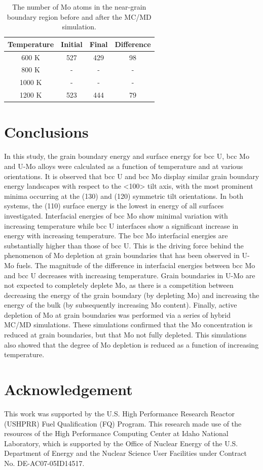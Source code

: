 \documentclass[review]{elsarticle}
\begin{document}
\begin{table}[h]
\caption{The number of Mo atoms in the near-grain boundary region before and after the MC/MD simulation. } \label{tab:mcmdtemp}
\begin{center}
\begin{tabular}{|c|c|c|c|}
	\hline
Temperature & Initial & Final & Difference \\
\hline
600 K & 527 & 429 & 98 \\
800 K & - & - & -\\ 
1000 K & - & - & - \\
1200 K & 523 & 444 & 79 \\
 	 \hline
\end{tabular}
\end{center}
\label{default}
\end{table}

\FloatBarrier

\section{Conclusions}

In this study, the grain boundary energy and surface energy for bcc U, bcc Mo and U-Mo alloys were calculated as a function of temperature and at various orientations. It is observed that bcc U and bcc Mo display similar grain boundary energy landscapes with respect to the <100> tilt axis, with the most prominent minima occurring at the (130) and (120) symmetric tilt orientations. In both systems, the (110) surface energy is the lowest in energy of all surfaces investigated. Interfacial energies of bcc Mo show minimal variation with increasing temperature while bcc U interfaces show a significant increase in energy with increasing temperature. The bcc Mo interfacial energies are substantially higher than those of bcc U. This is the driving force behind the phenomenon of Mo depletion at grain boundaries that has been observed in U-Mo fuels. The magnitude of the difference in interfacial energies between bcc Mo and bcc U decreases with increasing temperature. Grain boundaries in U-Mo are not expected to completely deplete Mo, as there is a competition between decreasing the energy of the grain boundary (by depleting Mo) and increasing the energy of the bulk (by subsequently increasing Mo content). Finally, active depletion of Mo at grain boundaries was performed via a series of hybrid MC/MD simulations. These simulations confirmed that the Mo concentration is reduced at grain boundaries, but that Mo not fully depleted. This simulations also showed that the degree of Mo depletion is reduced as a function of increasing temperature. 

\section{Acknowledgement}
This work was supported by the U.S. High Performance Research Reactor (USHPRR) Fuel Qualification (FQ) Program. This research made use of the resources of the High Performance Computing Center at Idaho National Laboratory, which is supported by the Office of Nuclear Energy of the U.S. Department of Energy and the Nuclear Science User Facilities under Contract No. DE-AC07-05ID14517.


\end{document}
